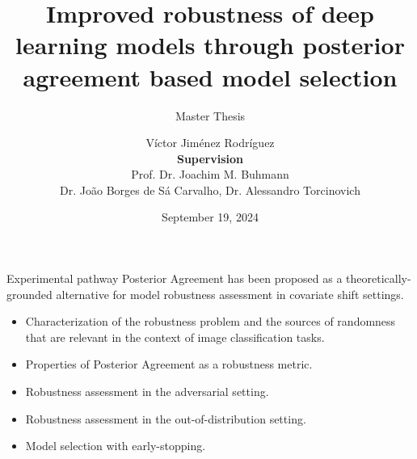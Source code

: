 

\renewcommand{\thefootnote}{\fnsymbol{footnote}}
\newcommand{\mailto}[1]{\href{mailto:#1}{#1}}

\newtheorem{assumption}{Assumption}
\newtheorem{proposition}{Proposition}

\title[
Improved robustness of deep learning models through
posterior agreement based model selection.
]
{Improved robustness of deep learning models through
posterior agreement based model selection}

\subtitle{\vspace{0.1cm} Master Thesis}


\author[Master Thesis -- V\'ictor Jim\'enez Rodr\'iguez]{
	V\'ictor Jim\'enez Rodr\'iguez \\
	\vspace{0.4cm}
	\footnotesize \textbf{Supervision}\\
    \footnotesize Prof. Dr. Joachim M. Buhmann\\
    \footnotesize Dr. Jo\~ao Borges de S\'a Carvalho, Dr. Alessandro Torcinovich
}

\date{September 19, 2024}


	
\begin{frame}
	\thispagestyle{empty}
	\titlepage
\end{frame}

\begin{frame}{Experimental pathway}
	Posterior Agreement has been proposed as a theoretically-grounded alternative for model
	robustness assessment in covariate shift settings.
	\vspace{0.5cm}
	\begin{itemize}
		\item[1.] Characterization of the robustness problem and the sources of randomness that are relevant in the context
		of image classification tasks.
		\item[2.] Properties of Posterior Agreement as a robustness metric.
		\item[3.] Robustness assessment in the adversarial setting.
		\item[4.] Robustness assessment in the out-of-distribution setting.
		\item[5.] Model selection with early-stopping.   
	\end{itemize}


\end{frame}


